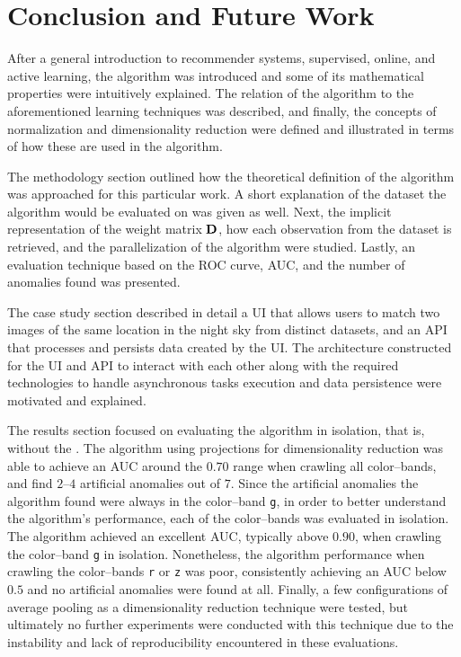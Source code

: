 \chapter{Conclusion and Future Work} \label{ch:conclusion}

After a general introduction to recommender systems, supervised, online, and active learning, the \mlblink algorithm was introduced and some of its mathematical properties were intuitively explained. The relation of the \mlblink algorithm to the aforementioned learning techniques was described, and finally, the concepts of normalization and dimensionality reduction were defined and illustrated in terms of how these are used in the \mlblink algorithm. \newline

The methodology section outlined how the theoretical definition of the \mlblink algorithm was approached for this particular work. A short explanation of the dataset the \mlblink algorithm would be evaluated on was given as well. Next, the implicit representation of the weight matrix $\boldsymbol{\mathbf{D}}$, how each observation from the dataset is retrieved, and the parallelization of the \mlblink algorithm were studied. Lastly, an evaluation technique based on the ROC curve, AUC, and the number of anomalies found was presented. \newline

The case study section described in detail a UI that allows users to match two images of the same location in the night sky from distinct datasets, and an API that processes and persists data created by the UI. The architecture constructed for the UI and API to interact with each other along with the required technologies to handle asynchronous tasks execution and data persistence were motivated and explained. \newline

The results section focused on evaluating the \mlblink algorithm in isolation, that is, without the \mlblinkui. The \mlblink algorithm using projections for dimensionality reduction was able to achieve an AUC around the $0.70$ range when crawling all \panstarrs color--bands, and find $2$--$4$ artificial anomalies out of $7$. Since the artificial anomalies the \mlblink algorithm found were always in the \panstarrs color--band \texttt{g}, in order to better understand the algorithm's performance, each of the \panstarrs color--bands was evaluated in isolation. The \mlblink algorithm achieved an excellent AUC, typically above $0.90$, when crawling the \panstarrs color--band \texttt{g} in isolation. Nonetheless, the \mlblink algorithm performance when crawling the \panstarrs color--bands \texttt{r} or \texttt{z} was poor, consistently achieving an AUC below $0.5$ and no artificial anomalies were found at all. Finally, a few configurations of average pooling as a dimensionality reduction technique were tested, but ultimately no further experiments were conducted with this technique due to the instability and lack of reproducibility encountered in these evaluations. \newline


